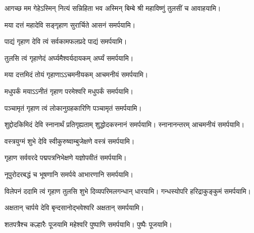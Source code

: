 {आगच्छ मम गेहेऽस्मिन् नित्यं सन्निहिता भव}
अस्मिन् बिम्बे श्री महाविष्णुं तुलसीं च आवाहयामि।
\medskip

\medskip
{}
{मया दत्तं महादेवि सङ्गृहाण सुरार्चिते}
 आसनं समर्पयामि।\medskip

{पाद्यं गृहाण देवि त्वं सर्वकामफलप्रदे}
 पाद्यं समर्पयामि।\medskip

{तुलसि त्वं गृहाणेदं अर्घ्यमैश्वर्यदायकम्}
 अर्घ्यं समर्पयामि।\medskip

{मया दत्तमिदं तोयं गृहाणाऽऽचमनीयकम्}
 आचमनीयं समर्पयामि।\medskip

{मधुपर्कं मयाऽऽनीतं गृहाण परमेश्वरि}
मधुपर्कं समर्पयामि।\medskip

{पञ्चामृतं गृहाण त्वं लोकानुग्रहकारिणि}
पञ्चामृतं समर्पयामि।\medskip


{शुद्दोदकिमिदं देवि स्नानार्थं प्रतिगृह्यताम्}
 शुद्धोदकस्नानं समर्पयामि। स्नानानन्तरम् आचमनीयं समर्पयामि।\medskip

 {वस्त्रयुग्मं शुभे देवि स्वीकुरुष्वाम्बुजेक्षणे}
 वस्त्रं समर्पयामि।\medskip

{गृहाण सर्ववरदे पद्मपत्रनिभेक्षणे}
 यज्ञोपवीतं समर्पयामि।\medskip

{नूपुरोदरबद्धं च भूषणानि समर्पये}
आभारणानि समर्पयामि।\medskip
 
{विलेपनं ददामि त्वं गृहाण तुलसि शुभे}
 दिव्यपरिमलगन्धान् धारयामि। गन्धस्योपरि हरिद्राकुङ्कुमं समर्पयामि। 

{अक्षतान् चार्पये देवि बृन्दसानोद्भवेश्वरि}
अक्षतान् समर्पयामि।\medskip

{शतपत्रैश्च कल्हारैः पूजयामि महेश्वरि}
 पुष्पाणि समर्पयामि।  पुष्पैः पूजयामि।

